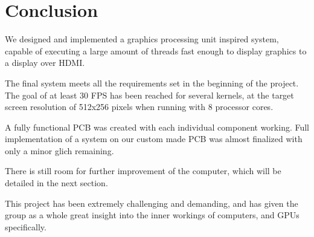 \documentclass[../main/report.tex]{subfiles}
\begin{document}
\chapter{Conclusion}

We designed and implemented a graphics processing unit inspired system,
capable of executing a large amount of threads fast enough to display graphics to a display over HDMI.

The final system meets all the requirements set in the beginning of the project.
The goal of at least 30 FPS has been reached for several kernels,
at the target screen resolution of 512x256 pixels when running with 8 processor cores.

A fully functional PCB was created with each individual component working.
Full implementation of a system on our custom made PCB was almost finalized with only a minor glich remaining.

There is still room for further improvement of the computer, which will be detailed in the next section.

This project has been extremely challenging and demanding,
and has given the group as a whole great insight into the inner workings of computers,
and GPUs specifically.
\end{document}
